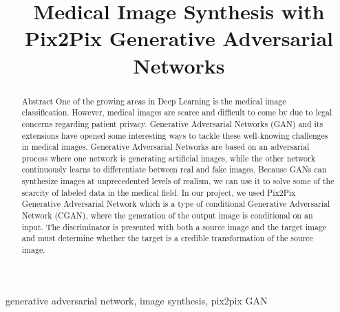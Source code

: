 \documentclass[conference]{IEEEtran}
\begin{document}
\title{Medical Image Synthesis with \\Pix2Pix Generative Adversarial Networks}


\author{
\and
{}
\and
{}
}

\maketitle

\begin{abstract}
    Abstract
One of the growing areas in Deep Learning is the medical image classification. However, medical images are scarce and difficult to come by due to legal concerns regarding patient privacy.  Generative Adversarial Networks (GAN) and its extensions have opened some interesting ways to tackle these well-knowing challenges in medical images.
Generative Adversarial Networks are based on an adversarial process where one network is generating artificial images, while the other network continuously learns to differentiate between real and fake images. Because GANs can synthesize images at unprecedented levels of realism, we can use it to solve some of the scarcity of labeled data in the medical field. 
In our project, we used Pix2Pix Generative Adversarial Network which is a type of conditional Generative Adversarial Network (CGAN), where the generation of the output image is conditional on an input. The discriminator is presented with both a source image and the target image and must determine whether the target is a credible transformation of the source image.
\end{abstract}

\begin{IEEEkeywords}
generative adversarial network, image synthesis, pix2pix GAN
\end{IEEEkeywords}
\end{document}
